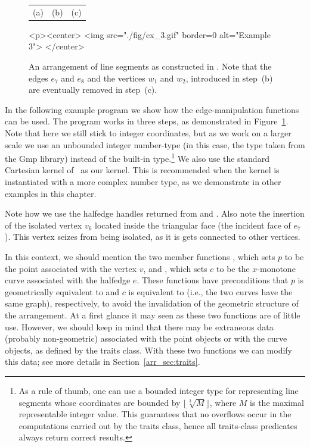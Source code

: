 \begin{figure}[!htp]
\begin{ccTexOnly}
\begin{center}
\begin{tabular}{ccc}
  {\small (a)} & {\small (b)} & {\small (c)}\\
  \end{tabular}
  \end{center}
\end{ccTexOnly}
\begin{ccHtmlOnly}
  <p><center>
  <img src="./fig/ex_3.gif" border=0 alt="Example 3">
  </center>
\end{ccHtmlOnly}
\caption{An arrangement of line segments as constructed
in . Note that the edges $e_7$ and $e_8$ and the
vertices $w_1$ and $w_2$, introduced in step~(b) are eventually
removed in step~(c).}
\label{arr_fig:ex_3}
\end{figure}

In the following example program we show how the edge-manipulation
functions can be used. The program works in three
steps, as demonstrated in Figure~\ref{arr_fig:ex_3}. Note that
here we still stick to integer coordinates, but as we work on a
larger scale we use an unbounded integer number-type (in this
case, the  type taken from the {\sc Gmp} library)
instead of the built-in  type.\footnote{As a rule of
thumb, one can use a bounded integer type for representing line
segments whose coordinates are bounded by
$\lfloor\sqrt[3]{M}\rfloor$, where $M$ is the maximal
representable integer value. This guarantees that no overflows occur
in the computations carried out by the traits class, hence all traits-class
predicates always return correct results.} We also use the standard Cartesian
kernel of \cgal\ as our kernel. This is recommended when the
kernel is instantiated with a more complex number type, as we
demonstrate in other examples in this chapter.


Note how we use the halfedge handles returned from
 and . Also note the insertion
of the isolated vertex $v_6$ located inside the triangular face (the
incident face of $e_7$). This vertex seizes from being isolated, as it
is gets connected to other vertices.

In this context, we should mention the two member functions
, which sets $p$ to be the point
associated with the vertex $v$, and , which
sets $c$ to be the $x$-monotone curve associated with the halfedge
$e$. These functions have preconditions that $p$ is
geometrically equivalent to  and $c$ is equivalent
to  (i.e., the two curves have the same graph),
respectively, to avoid the invalidation of the geometric structure of
the arrangement. At a first glance it may seen as these two functions
are of little use. However, we should keep in mind that there may be
extraneous data (probably non-geometric) associated with the point
objects or with the curve objects, as defined by the traits class. With
these two functions we can modify this data; see more details in
Section~\ref{arr_sec:traits}.

